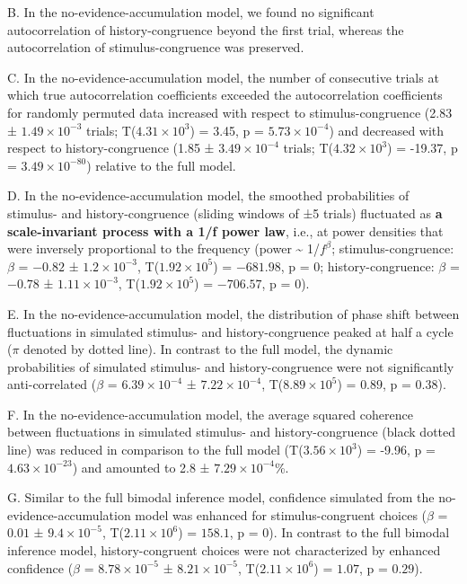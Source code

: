 \documentclass[
]{article}
\begin{document}
B. In the no-evidence-accumulation model, we found no significant
autocorrelation of history-congruence beyond the first trial, whereas
the autocorrelation of stimulus-congruence was preserved.

C. In the no-evidence-accumulation model, the number of consecutive
trials at which true autocorrelation coefficients exceeded the
autocorrelation coefficients for randomly permuted data increased with
respect to stimulus-congruence (2.83 ± \ensuremath{1.49\times 10^{-3}}
trials; T(\ensuremath{4.31\times 10^{3}}) = 3.45, p =
\(\ensuremath{5.73\times 10^{-4}}\)) and decreased with respect to
history-congruence (1.85 ± \ensuremath{3.49\times 10^{-4}} trials;
T(\ensuremath{4.32\times 10^{3}}) = -19.37, p =
\(\ensuremath{3.49\times 10^{-80}}\)) relative to the full model.

D. In the no-evidence-accumulation model, the smoothed probabilities of
stimulus- and history-congruence (sliding windows of ±5 trials)
fluctuated as \textbf{a scale-invariant process with a 1/f power law},
i.e., at power densities that were inversely proportional to the
frequency (power \textasciitilde{} 1/\(f^\beta\); stimulus-congruence:
\(\beta\) = \(-0.82\) ± \(\ensuremath{1.2\times 10^{-3}}\),
T(\(\ensuremath{1.92\times 10^{5}}\)) = \(-681.98\), p = \(0\);
history-congruence: \(\beta\) = \(-0.78\) ±
\(\ensuremath{1.11\times 10^{-3}}\),
T(\(\ensuremath{1.92\times 10^{5}}\)) = \(-706.57\), p = \(0\)).

E. In the no-evidence-accumulation model, the distribution of phase
shift between fluctuations in simulated stimulus- and history-congruence
peaked at half a cycle (\(\pi\) denoted by dotted line). In contrast to
the full model, the dynamic probabilities of simulated stimulus- and
history-congruence were not significantly anti-correlated (\(\beta\) =
\(\ensuremath{6.39\times 10^{-4}}\) ±
\(\ensuremath{7.22\times 10^{-4}}\),
T(\(\ensuremath{8.89\times 10^{5}}\)) = \(0.89\), p = \(0.38\)).

F. In the no-evidence-accumulation model, the average squared coherence
between fluctuations in simulated stimulus- and history-congruence
(black dotted line) was reduced in comparison to the full model
(T(\ensuremath{3.56\times 10^{3}}) = -9.96, p =
\(\ensuremath{4.63\times 10^{-23}}\)) and amounted to 2.8 ±
\ensuremath{7.29\times 10^{-4}}\%.

G. Similar to the full bimodal inference model, confidence simulated
from the no-evidence-accumulation model was enhanced for
stimulus-congruent choices (\(\beta\) = \(0.01\) ±
\(\ensuremath{9.4\times 10^{-5}}\),
T(\(\ensuremath{2.11\times 10^{6}}\)) = \(158.1\), p = \(0\)). In
contrast to the full bimodal inference model, history-congruent choices
were not characterized by enhanced confidence (\(\beta\) =
\(\ensuremath{8.78\times 10^{-5}}\) ±
\(\ensuremath{8.21\times 10^{-5}}\),
T(\(\ensuremath{2.11\times 10^{6}}\)) = \(1.07\), p = \(0.29\)).
\end{document}
